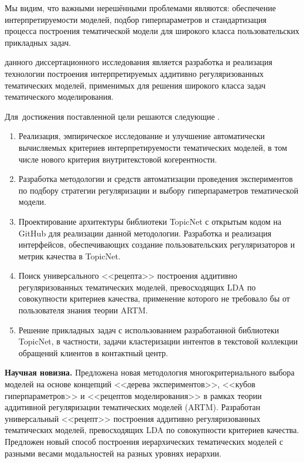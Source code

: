 Мы видим, что важными нерешёнными проблемами являются: обеспечение  интерпретируемости моделей, подбор гиперпараметров и стандартизация процесса построения тематической модели для широкого класса пользовательских прикладных задач.

{\aim} данного диссертационного исследования является разработка и реализация технологии построения интерпретируемых аддитивно регуляризованных тематических моделей, применимых для решения широкого класса задач тематического моделирования.

Для~достижения поставленной цели решаются следующие {\tasks}.
\begin{enumerate}[beginpenalty=10000] %
  \item Реализация, эмпирическое исследование и улучшение автоматически вычисляемых критериев интерпретируемости тематических моделей, в том числе нового критерия внутритекстовой когерентности.
  \item Разработка методологии и средств автоматизации проведения экспериментов по подбору стратегии регуляризации и выбору гиперпараметров тематической модели.
  \item Проектирование архитектуры библиотеки TopicNet с открытым кодом на GitHub для реализации данной методологии. Разработка и реализация интерфейсов, обеспечивающих создание пользовательских регуляризаторов и метрик качества в TopicNet.
  \item Поиск универсального <<рецепта>> построения аддитивно регуляризованных тематических моделей, превосходящих LDA по совокупности критериев качества, применение которого не требовало бы от пользователя знания теории ARTM.
  \item Решение прикладных задач с использованием разработанной библиотеки TopicNet, в частности, задачи кластеризации интентов в текстовой коллекции обращений клиентов в контактный центр.
\end{enumerate}

\textbf{Научная новизна.}
Предложена новая методология многокритериального выбора моделей на основе концепций <<дерева экспериментов>>, <<кубов гиперпараметров>> и <<рецептов моделирования>> в рамках теории аддитивной регуляризации тематических моделей (ARTM).
Разработан универсальный <<рецепт>> построения аддитивно регуляризованных тематических моделей, превосходящих LDA по совокупности критериев качества.
Предложен новый способ построения иерархических тематических моделей с разными весами модальностей на разных уровнях иерархии.


